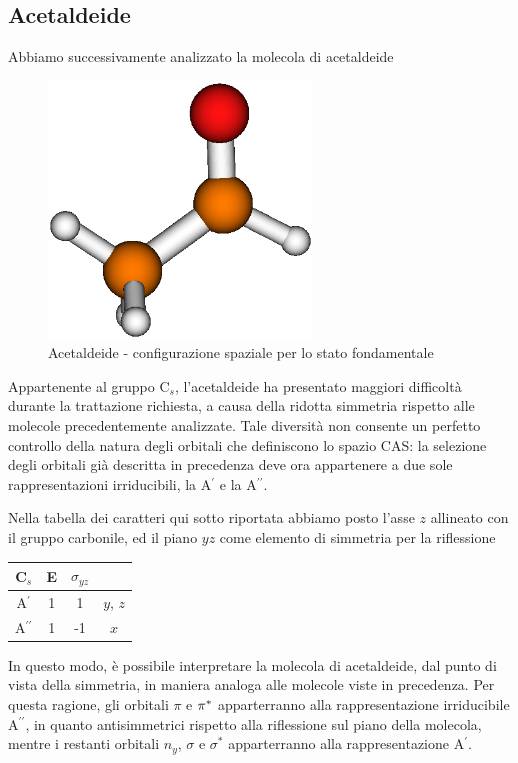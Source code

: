 \subsection{Acetaldeide}

Abbiamo successivamente analizzato la molecola di acetaldeide
\begin{figure}[ht]
\begin{center}
\includegraphics[angle=270,width=7cm,keepaspectratio]{immagini/acetaldeide/geom.eps}
\parbox[h]{10cm}{
\caption{\small Acetaldeide - configurazione spaziale per lo stato fondamentale}
\label{fig:acetaldeide_geom}
}
\end{center}
\end{figure}

Appartenente al gruppo C$_s$, l'acetaldeide ha presentato maggiori
difficolt\`a durante la trattazione richiesta, a causa della ridotta
simmetria rispetto alle molecole precedentemente analizzate. Tale
diversit\`a non consente un perfetto controllo della natura degli orbitali
che definiscono lo spazio CAS: la
selezione degli orbitali gi\`a descritta in precedenza deve ora appartenere
a due sole rappresentazioni irriducibili, la A$^{\prime}$ e la A$^{\prime\prime}$.

Nella tabella dei caratteri qui sotto riportata abbiamo posto l'asse $z$
allineato con il gruppo carbonile, ed il piano $yz$ come elemento di
simmetria per la riflessione \begin{center}
\begin{tabular}{c|cc|c}
  C$_s$				& E		& $\sigma_{yz}$	&           \\
\hline
    A$^{\prime}$  		& 1		&   1			&  $y$, $z$	\\
    A$^{\prime\prime}$	& 1		&  -1			&  $x$      \\
\end{tabular}
\end{center}
In questo modo, \`e possibile interpretare la molecola di acetaldeide, dal
punto di vista della simmetria, in maniera analoga alle molecole viste in
precedenza. Per questa ragione, gli orbitali $\pi$ e $\pi^{*}$ apparterranno alla
rappresentazione irriducibile A$^{\prime\prime}$, in quanto antisimmetrici
rispetto alla riflessione sul piano della molecola, mentre i restanti
orbitali $n_y$, $\sigma$ e $\sigma^{*}$ apparterranno alla rappresentazione
A$^{\prime}$.

